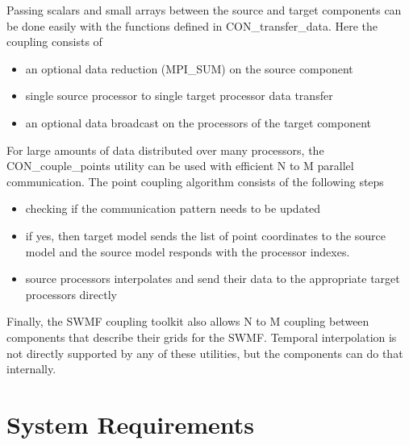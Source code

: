 Passing scalars and small arrays between
the source and target components can be done easily with the functions defined in 
CON\_transfer\_data. Here the coupling consists of
\begin{itemize}
\item an optional data reduction (MPI\_SUM) on the source component
\item single source processor to single target processor data transfer
\item an optional data broadcast on the processors of the target component
\end{itemize}
For large amounts of data distributed over many processors, the 
CON\_couple\_points utility can be used with efficient N to M parallel
communication. The point coupling algorithm consists of the following steps
\begin{itemize}
\item checking if the communication pattern needs to be updated
\item if yes, then target model sends the list of point coordinates 
      to the source model and the source model responds with the processor
      indexes.
\item source processors interpolates and send their data to the appropriate
      target processors directly
\end{itemize}
Finally, the SWMF coupling toolkit also allows N to M coupling between 
components that describe their grids for the SWMF.
Temporal interpolation is not directly supported by any of these
utilities, but the components can do that internally.

\section{System Requirements}

